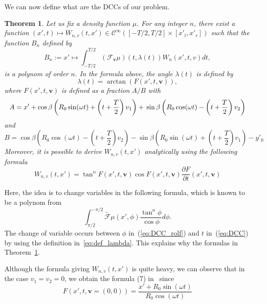 \documentclass[9pt,technote]{IEEEtran}
\numberwithin{equation}{section}
\newcommand{\Cinf}{\mathcal{C}^{\infty}}
\newcommand{\bv}{\mathbf{v}}
\newcommand{\Tbv}{\mathcal{F}_{\mathbf{v}}}
\newtheorem{theorem}{Theorem}
\begin{document}
We can now define what are the DCCs of our problem.
\begin{theorem}
\label{theo:main}
Let us fix a density function $\mu$. For any integer $n$, there exist a function $(x',t)\mapsto W_{n,v}(t,x') \in \Cinf \left( [-T/2,T/2] \times [x'_l,x'_r] \right)$ such that the function $B_n$ defined by
\begin{equation}
	B_n := x' \mapsto \int_{-T/2}^{T/2} \left( \Tbv \mu \right)\left( t,\lambda(t) \right) W_n(x',t,v) dt,
\label{eq:DCC}
\end{equation}
is a polynom of order $n$. In the formula above, the angle $\lambda(t)$ is defined by
\begin{equation}
	\lambda(t) = \arctan \left( F(x',t,\bv) \right),
\label{eq:def_lambda}
\end{equation}
where $F(x',t,\bv)$ is defined as a fraction $A/B$ with
\begin{dmath}
	A = x' + \cos \beta \left( R_0 \sin(\omega t) + \left( t + \frac{T}{2} \right)v_1 \right) + \\
	\sin \beta \left( R_0 \cos(\omega t) - \left( t + \frac{T}{2} \right)v_2 \right)
\end{dmath}
and
\begin{dmath}
	B = \cos \beta \left( R_0 \cos(\omega t) - \left( t + \frac{T}{2} \right)v_2 \right) - \sin \beta \left( R_0 \sin(\omega t) + \left( t + \frac{T}{2} \right)v_1 \right) - y'_0 
\end{dmath}
Moreover, it is possible to derive $W_{n,v}(t,x')$ analytically using the following formula
\begin{equation}
	W_{n,v}(t,x') = \tan^n F(x',t,\bv) \cos F(x',t,\bv) \frac{\partial F}{\partial t} (x',t,\bv)
\end{equation}
\end{theorem}

Here, the idea is to change variables in the following formula, which is known to be a polynom from~\cite{clackdoyle2013necessary}
\begin{equation}
	\int_{\pi/2}^{-\pi/2} \tilde{\mathcal{F}}\mu (x',\phi) \frac{\tan^n \phi}{\cos \phi} d\phi.
\label{eq:DCC_rolf}
\end{equation}
The change of variable occurs between $\phi$ in~(\ref{eq:DCC_rolf}) and $t$ in~(\ref{eq:DCC}) by using the definition in~\ref{eq:def_lambda}. This explains why the formulas in Theorem~\ref{theo:main}.

Although the formula giving $W_{n,v}(t,x')$ is quite heavy, we can observe that in the case $v_1=v_2=0$, we obtain the formula (7) in~\cite{clackdoyle2015consistency} since
\begin{equation}
	F \left( x',t,\bv = (0,0) \right) = \frac{x' + R_0 \sin(\omega t)}{R_0 \cos(\omega t)}
\end{equation}
\end{document}
